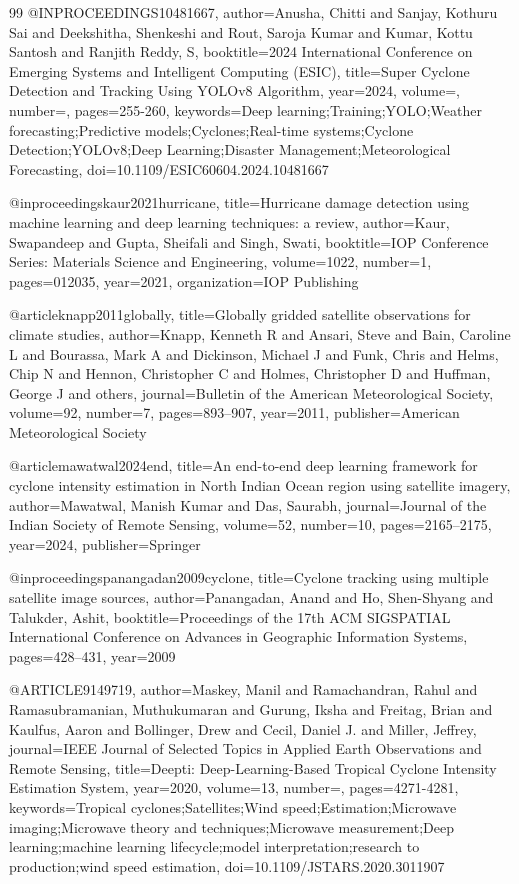 \begin{thebibliography}{99}
@INPROCEEDINGS{10481667,
  author={Anusha, Chitti and Sanjay, Kothuru Sai and Deekshitha, Shenkeshi and Rout, Saroja Kumar and Kumar, Kottu Santosh and Ranjith Reddy, S},
  booktitle={2024 International Conference on Emerging Systems and Intelligent Computing (ESIC)}, 
  title={Super Cyclone Detection and Tracking Using YOLOv8 Algorithm}, 
  year={2024},
  volume={},
  number={},
  pages={255-260},
  keywords={Deep learning;Training;YOLO;Weather forecasting;Predictive models;Cyclones;Real-time systems;Cyclone Detection;YOLOv8;Deep Learning;Disaster Management;Meteorological Forecasting},
  doi={10.1109/ESIC60604.2024.10481667}}


@inproceedings{kaur2021hurricane,
  title={Hurricane damage detection using machine learning and deep learning techniques: a review},
  author={Kaur, Swapandeep and Gupta, Sheifali and Singh, Swati},
  booktitle={IOP Conference Series: Materials Science and Engineering},
  volume={1022},
  number={1},
  pages={012035},
  year={2021},
  organization={IOP Publishing}
}

@article{knapp2011globally,
  title={Globally gridded satellite observations for climate studies},
  author={Knapp, Kenneth R and Ansari, Steve and Bain, Caroline L and Bourassa, Mark A and Dickinson, Michael J and Funk, Chris and Helms, Chip N and Hennon, Christopher C and Holmes, Christopher D and Huffman, George J and others},
  journal={Bulletin of the American Meteorological Society},
  volume={92},
  number={7},
  pages={893--907},
  year={2011},
  publisher={American Meteorological Society}
}

@article{mawatwal2024end,
  title={An end-to-end deep learning framework for cyclone intensity estimation in North Indian Ocean region using satellite imagery},
  author={Mawatwal, Manish Kumar and Das, Saurabh},
  journal={Journal of the Indian Society of Remote Sensing},
  volume={52},
  number={10},
  pages={2165--2175},
  year={2024},
  publisher={Springer}
}

@inproceedings{panangadan2009cyclone,
  title={Cyclone tracking using multiple satellite image sources},
  author={Panangadan, Anand and Ho, Shen-Shyang and Talukder, Ashit},
  booktitle={Proceedings of the 17th ACM SIGSPATIAL International Conference on Advances in Geographic Information Systems},
  pages={428--431},
  year={2009}
}

@ARTICLE{9149719,
  author={Maskey, Manil and Ramachandran, Rahul and Ramasubramanian, Muthukumaran and Gurung, Iksha and Freitag, Brian and Kaulfus, Aaron and Bollinger, Drew and Cecil, Daniel J. and Miller, Jeffrey},
  journal={IEEE Journal of Selected Topics in Applied Earth Observations and Remote Sensing}, 
  title={Deepti: Deep-Learning-Based Tropical Cyclone Intensity Estimation System}, 
  year={2020},
  volume={13},
  number={},
  pages={4271-4281},
  keywords={Tropical cyclones;Satellites;Wind speed;Estimation;Microwave imaging;Microwave theory and techniques;Microwave measurement;Deep learning;machine learning lifecycle;model interpretation;research to production;wind speed estimation},
  doi={10.1109/JSTARS.2020.3011907}}



\end{thebibliography}
